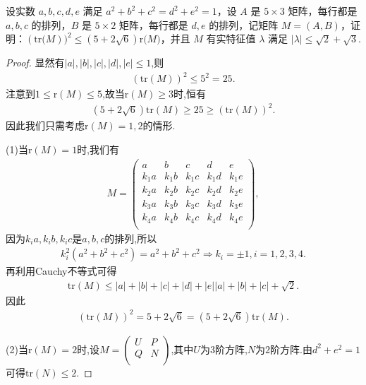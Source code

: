 \documentclass[../../main.tex]{subfiles}
\begin{document}
\begin{example}
设实数 $a,b,c,d,e$ 满足 $a^2 + b^2 + c^2 = d^2 + e^2 = 1$，设 $A$ 是 $5 \times 3$ 矩阵，每行都是 $a,b,c$ 的排列，$B$ 是 $5 \times 2$ 矩阵，每行都是 $d,e$ 的排列，记矩阵 $M = (A,B)$，证明：$(\mathrm{tr(}M))^2\leqslant \left( 5+2\sqrt{6} \right) \mathrm{r(}M)$，并且 $M$ 有实特征值 $\lambda$ 满足 $|\lambda| \leqslant  \sqrt{2} + \sqrt{3}$.
\end{example}
\begin{proof}
显然有$|a|,|b|,|c|,|d|,|e|\leqslant 1$,则
\begin{align*}
(\mathrm{tr}(M))^2\leqslant 5^2=25.
\end{align*}
注意到$1\leqslant \mathrm{r}(M) \leqslant 5$,故当$\mathrm{r}(M) \geqslant 3$时,恒有
\begin{align*}
\left( 5+2\sqrt{6} \right) \mathrm{tr}(M)\geqslant 25\geqslant (\mathrm{tr}(M))^2.
\end{align*}
因此我们只需考虑$\mathrm{r}(M) =1,2$的情形.

(1)当$\mathrm{r}(M) =1$时,我们有
\begin{align*}
M=\begin{pmatrix}
a&		b&		c&		d&		e\\
k_1a&		k_1b&		k_1c&		k_1d&		k_1e\\
k_2a&		k_2b&		k_2c&		k_2d&		k_2e\\
k_3a&		k_3b&		k_3c&		k_3d&		k_3e\\
k_4a&		k_4b&		k_4c&		k_4d&		k_4e\\
\end{pmatrix},
\end{align*}
因为$k_ia,k_ib,k_ic$是$a,b,c$的排列,所以
\begin{align*}
k_{i}^{2}\left( a^2+b^2+c^2 \right) =a^2+b^2+c^2\Rightarrow k_i=\pm 1,i=1,2,3,4.
\end{align*}
再利用Cauchy不等式可得
\begin{align*}
\mathrm{tr}\left( M \right) \leqslant |a|+|b|+|c|+|d|+|e| |a|+|b|+|c|+\sqrt{2}.
\end{align*}
因此
\begin{align*}
\left( \mathrm{tr}\left( M \right) \right) ^2=5+2\sqrt{6}=\left( 5+2\sqrt{6} \right) \mathrm{tr}(M).
\end{align*}

(2)当$\mathrm{r}(M) =2$时,设$M=\begin{pmatrix}
U&		P\\
Q&		N\\
\end{pmatrix}$,其中$U$为$3$阶方阵,$N$为$2$阶方阵.由$d^2+e^2=1$可得$\mathrm{tr}(N) \leqslant 2$.


\end{proof}
\end{document}
